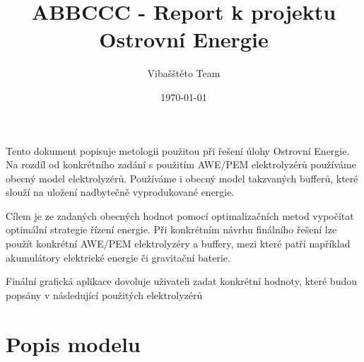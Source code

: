 \documentclass[twoside,11pt]{article}
\title{ABBCCC - Report k projektu Ostrovní Energie}
\author{Vibašštěto Team}
\date{\today}
\begin{document}
\maketitle
Tento dokument popisuje metologii použitou při řešení úlohy Ostrovní Energie.
Na rozdíl od konkrétního zadání s použitím AWE/PEM elektrolyzérů používáme
obecný model elektrolyzérů. Používáme i obecný model takzvaných bufferů,
které slouží na uložení nadbytečně vyprodukované energie.

Cílem je ze zadaných obecných hodnot pomocí optimalizačních metod vypočítat
optimální strategie řízení energie. Při konkrétním návrhu finálního řešení
lze použít konkrétní AWE/PEM elektrolyzéry a buffery, mezi které patří
například akumulátory elektrické energie či gravitační baterie.

Finální grafická aplikace dovoluje uživateli zadat konkrétní hodnoty,
které budou popsány v následující 
použitých elektrolyzérů

\section{Popis modelu}
\end{document}
